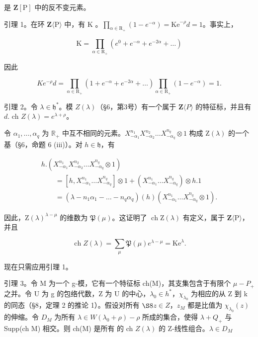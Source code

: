 是 \(\mathbf{Z}[\mathrm{P}]\) 中的反不变元素。

引理 1。在环 \(\mathbf{Z}\langle \mathrm{P}\rangle\) 中，有 \(\mathrm{K}\) 。\(\prod_{\alpha \in \mathrm{R}_{+}}(1 - e^{-\alpha}) = \mathrm{Ke}^{-\rho}d = 1\)。事实上，

\[
\mathrm{K} = \prod_ {\alpha \in \mathrm{R} _ {+}} \left(e ^ {0} + e ^ {- \alpha} + e ^ {- 2 \alpha} + \dots\right)
\]

因此

\[
K e ^ {- \rho} d = \prod_ {\alpha \in \mathrm{R} _ {+}} \left(1 + e ^ {- \alpha} + e ^ {- 2 \alpha} + \dots\right) \prod_ {\alpha \in \mathrm{R} _ {+}} \left(1 - e ^ {- \alpha}\right) = 1.
\]

引理 2。令 \(\lambda \in \mathfrak{h}^*\)。模 \(Z(\lambda)\)（§6，第3号）有一个属于 \(\mathbf{Z}\langle P\rangle\) 的特征标，并且有 \(d.\) ch \(Z(\lambda) = e^{\lambda + \rho}\)。

令 \(\alpha_{1},\ldots ,\alpha_{q}\) 为 \(\mathbb{R}_+\) 中互不相同的元素。\(X_{-\alpha_1}^{n_1}X_{-\alpha_2}^{n_2}\dots X_{-\alpha_q}^{n_q}\otimes 1\) 构成 \(\mathrm{Z}(\lambda)\) 的一个基（§6，命题 6 (iii)）。对 \(h\in \mathfrak{h}\)，有

\[
\begin{array}{l} h. (X _ {- \alpha_ {1}} ^ {n _ {1}} X _ {- \alpha_ {2}} ^ {n _ {2}} \ldots X _ {- \alpha_ {q}} ^ {n _ {q}} \otimes 1) \\ \qquad = [ h, X _ {- \alpha_ {1}} ^ {n _ {1}} \ldots X _ {- \alpha_ {q}} ^ {n _ {q}} ] \otimes 1 + (X _ {- \alpha_ {1}} ^ {n _ {1}} \ldots X _ {- \alpha_ {q}} ^ {n _ {q}}) \otimes h. 1 \\ \qquad = (\lambda - n _ {1} \alpha_ {1} - \dots - n _ {q} \alpha_ {q}) (h) (X _ {- \alpha_ {1}} ^ {n _ {1}} \ldots X _ {- \alpha_ {q}} ^ {n _ {q}} \otimes 1). \end{array}
\]

因此，\(\mathrm{Z}(\lambda)^{\lambda - \mu}\) 的维数为 \(\mathfrak{P}(\mu)\)。这证明了 \(\operatorname{ch} \mathrm{Z}(\lambda)\) 有定义，属于 \(\mathbf{Z}\langle \mathrm{P} \rangle\)，并且

\[
\operatorname{ch} Z (\lambda) = \sum_ {\mu} \mathfrak {P} (\mu) e ^ {\lambda - \mu} = \mathrm{Ke} ^ {\lambda}.
\]

现在只需应用引理 1。

引理 3。令 M 为一个 g-模，它有一个特征标 ch(M)，其支集包含于有限个 \(\mu-P_{+}\) 之并。令 U 为 g 的包络代数，Z 为 U 的中心，\(\lambda_{0}\in h^{*}\)，\(\chi_{\lambda_{0}}\) 为相应的从 Z 到 k 的同态（§8，定理 2 的推论 1）。假设对所有 \(\S8\)\(z\in Z\)，\(z_{M}\) 都是比值为 \(\chi_{\lambda_{0}}(z)\) 的伸缩。令 \(D_{M}\) 为所有 \(\lambda\in W(\lambda_{0}+\rho)-\rho\) 所成的集合，使得 \(\lambda+Q_{+}\) 与 Supp(ch M) 相交。则 ch(M) 是所有  的 ch \(Z(\lambda)\) 的 Z-线性组合。\(\lambda\in D_{M}\)

